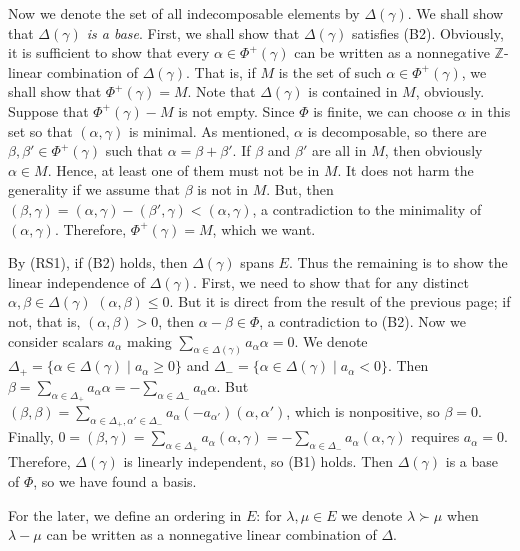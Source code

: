 \documentclass{article}
\newcommand{\InZ}{\mathbb{Z}}
\newcommand{\SBar}{\;|\;}
\begin{document}
Now we denote the set of all indecomposable elements by $\Delta(\gamma)$.
We shall show that \textit{$\Delta(\gamma)$ is a base}.
First, we shall show that $\Delta(\gamma)$ satisfies (B2).
Obviously, it is sufficient to show that every $\alpha \in \Phi^+(\gamma)$ can be written as a nonnegative $\InZ$-linear combination of $\Delta(\gamma)$.
That is, if $M$ is the set of such $\alpha \in \Phi^+(\gamma)$, we shall show that $\Phi^+(\gamma) = M$.
Note that $\Delta(\gamma)$ is contained in $M$, obviously.
Suppose that $\Phi^+(\gamma) - M$ is not empty.
Since $\Phi$ is finite, we can choose $\alpha$ in this set so that $(\alpha, \gamma)$ is minimal.
As mentioned, $\alpha$ is decomposable, so there are $\beta, \beta' \in \Phi^+(\gamma)$ such that $\alpha = \beta + \beta'$.
If $\beta$ and $\beta'$ are all in $M$, then obviously $\alpha \in M$.
Hence, at least one of them must not be in $M$.
It does not harm the generality if we assume that $\beta$ is not in $M$.
But, then $(\beta, \gamma) = (\alpha, \gamma) - (\beta', \gamma) < (\alpha, \gamma)$, a contradiction to the minimality of $(\alpha, \gamma)$.
Therefore, $\Phi^+(\gamma) = M$, which we want.

By (RS1), if (B2) holds, then $\Delta(\gamma)$ spans $E$.
Thus the remaining is to show the linear independence of $\Delta(\gamma)$.
First, we need to show that for any distinct $\alpha, \beta \in \Delta(\gamma)$ $(\alpha, \beta) \le 0$.
But it is direct from the result of the previous page; if not, that is, $(\alpha, \beta) > 0$, then $\alpha - \beta \in \Phi$, a contradiction to (B2).
Now we consider scalars $a_{\alpha}$ making $\sum_{\alpha \in \Delta(\gamma)} a_{\alpha} \alpha = 0$.
We denote $\Delta_+ = \{\alpha \in \Delta(\gamma) \SBar a_{\alpha} \ge 0\}$ and $\Delta_- = \{\alpha \in \Delta(\gamma) \SBar a_{\alpha} < 0\}$.
Then $\beta = \sum_{\alpha \in \Delta_+} a_{\alpha} \alpha = -\sum_{\alpha \in \Delta_-} a_{\alpha} \alpha$.
But $(\beta, \beta) = \sum_{\alpha \in \Delta_+, \alpha' \in \Delta_-} a_{\alpha} (-a_{\alpha'}) (\alpha, \alpha')$, which is nonpositive, so $\beta = 0$.
Finally, $0 = (\beta, \gamma) = \sum_{\alpha \in \Delta_+} a_{\alpha} (\alpha, \gamma) = -\sum_{\alpha \in \Delta_-} a_{\alpha} (\alpha, \gamma)$ requires $a_{\alpha} = 0$.
Therefore, $\Delta(\gamma)$ is linearly independent, so (B1) holds.
Then $\Delta(\gamma)$ is a base of $\Phi$, so we have found a basis.

For the later, we define an ordering in $E$: for $\lambda , \mu \in E$ we denote $\lambda \succ \mu$ when $\lambda - \mu$ can be written as a nonnegative linear combination of $\Delta$.
\end{document}

